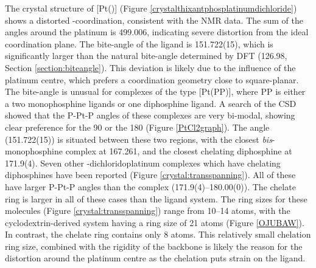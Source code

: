 The crystal structure of [Pt(\tButhixantphos)] (Figure \ref{crystalthixantphosplatinumdichloride}) shows a distorted \trans-coordination, consistent with the NMR data.  The sum of the angles around the platinum is 499.006\degrees{}, indicating severe distortion from the ideal coordination plane. The bite-angle of the ligand is 151.722(15)\degrees{}, which is significantly larger than the natural bite-angle determined by DFT (126.98\degrees{}, Section \ref{section:biteangle}).  This deviation is likely due to the influence of the platinum centre, which prefers a coordination geometry close to square-planar.  The bite-angle is unusual for complexes of the type [Pt(PP)], where PP is either a two monophosphine ligands or one diphosphine ligand.  A search of the \gls{CSD} showed that the P-Pt-P angles of these complexes are very bi-modal, showing clear preference for the \cis{} 90\degrees{} or the \trans{} 180\degrees{} (Figure \ref{PtCl2graph}).\cite{Allen2002}  The \tButhixantphos{} angle (151.722(15)\degrees) is situated between these two regions, with the closest \emph{bis}-monophosphine complex at 167.261, and the closest chelating diphosphine at 171.9(4)\degrees{}.  Seven other \trans{}-dichloridoplatinum complexes which have chelating diphosphines have been reported (Figure \ref{crystal:transspanning}).\cite{Bachechi1992, Engeldinger2003, Newman2012, Owens2008, Beuken1997, Freixa2003b, Ruhland2007}  All of these have larger P-Pt-P angles than the \tButhixantphos{} complex (171.9(4)--180.00(0)\degrees{}).  The chelate ring is larger in all of these cases than the \tButhixantphos{} ligand system.  The ring sizes for these molecules (Figure \ref{crystal:transspanning}) range from 10--14 atoms, with the cyclodextrin-derived system having a ring size of 21 atoms (Figure \ref{OJUBAW}).  In contrast, the \tButhixantphos{} chelate ring contains only 8 atoms.  This relatively small chelation ring size, combined with the rigidity of the backbone is likely the reason for the distortion around the platinum centre as the \trans{} chelation puts strain on the \tButhixantphos{} ligand.  

